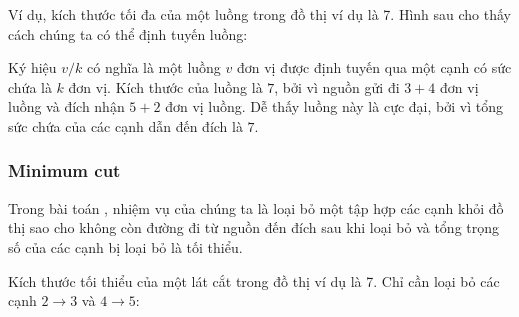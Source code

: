 Ví dụ, kích thước tối đa của một luồng
trong đồ thị ví dụ là 7.
Hình sau cho thấy cách chúng ta có thể
định tuyến luồng:

\begin{center}
\end{center}

Ký hiệu $v/k$ có nghĩa là
một luồng $v$ đơn vị được định tuyến qua
một cạnh có sức chứa là $k$ đơn vị.
Kích thước của luồng là $7$,
bởi vì nguồn gửi đi $3+4$ đơn vị luồng
và đích nhận $5+2$ đơn vị luồng.
Dễ thấy luồng này là cực đại,
bởi vì tổng sức chứa của các cạnh
dẫn đến đích là $7$.

\subsubsection{Minimum cut}


Trong bài toán ,
nhiệm vụ của chúng ta là loại bỏ một tập hợp
các cạnh khỏi đồ thị
sao cho không còn đường đi từ nguồn
đến đích sau khi loại bỏ
và tổng trọng số của các cạnh bị loại bỏ
là tối thiểu.

Kích thước tối thiểu của một lát cắt trong đồ thị ví dụ là 7.
Chỉ cần loại bỏ các cạnh $2 \rightarrow 3$
và $4 \rightarrow 5$:

